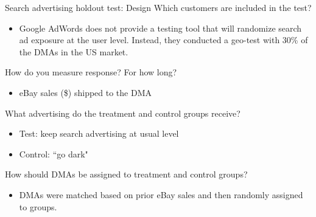 \documentclass[10pt, aspectratio=169]{beamer}
\begin{document}
\begin{frame}{Search advertising holdout test: Design}
Which customers are included in the test?\\
\begin{itemize}
\item Google AdWords does not provide a testing tool that will randomize search ad exposure at the user level. Instead, they conducted a \alert{geo-test} with 30\% of the DMAs in the US market. 
\end{itemize}
\pause
How do you measure response? For how long?
\begin{itemize}
\item eBay sales (\$) shipped to the DMA
\end{itemize}
\pause
What advertising do the treatment and control groups receive?\\
\begin{itemize}
\item Test: keep search advertising at usual level
\item Control: ``go dark"
\end{itemize}
\pause
How should DMAs be assigned to treatment and control groups? \\
\begin{itemize}
\item DMAs were \alert{matched} based on prior eBay sales and then randomly assigned to groups.
\end{itemize}
\end{frame}
\end{document}
